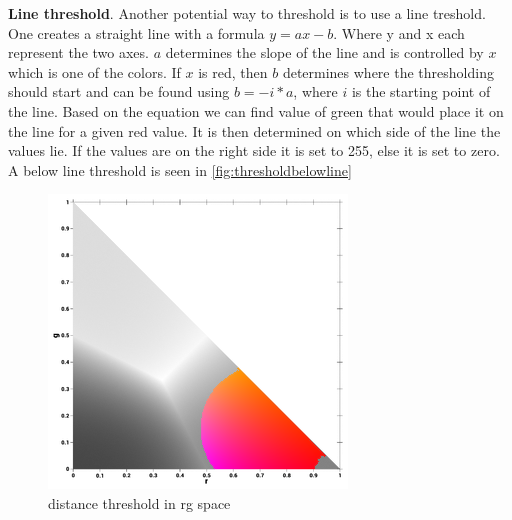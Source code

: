 {\textbf{Line threshold}. Another potential way to threshold is to use a line treshold. One creates a straight line with a formula $y = ax - b$. Where y and x each represent the two axes. $a$ determines the slope of the line and is controlled by $x$ which is one of the colors. If $x$ is red, then $b$ determines where the thresholding should start and can be found using $b =- i * a$, where $i$ is the starting point of the line. Based on the equation we can find value of green that would place it on the line for a given red value. It is then determined on which side of the line the values lie. If the values are on the right side it is set to 255, else it is set to zero. A below line threshold is seen in \autoref{fig:thresholdbelowline}\\
\begin{multicols}{2}
	\begin{figure}[H]
		\centering
		\label{thresholddist}
		\includegraphics[width=1\linewidth]{figure/Analysis/distthresholdcolor.png}
		\caption{distance threshold in rg space}
	\end{figure}
	

\end{multicols}}
